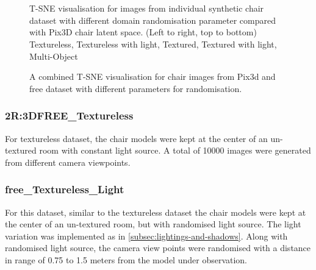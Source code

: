 \begin{figure}[!ht]
    \centering
    \resizebox{0.49\linewidth}{5cm}{}
    \resizebox{0.49\linewidth}{5cm}{}\\
    \resizebox{0.49\linewidth}{5cm}{}
    \resizebox{0.49\linewidth}{5cm}{}\\
    \resizebox{0.49\linewidth}{5cm}{}
    \caption{T-SNE visualisation for images from individual synthetic chair dataset with different domain randomisation parameter compared with Pix3D chair latent space.
        (Left to right, top to bottom) Textureless, Textureless with light, Textured, Textured with light, Multi-Object}
    \label{fig:tsne per chair dataset}
\end{figure}


\begin{figure}
    \centering
    \resizebox{\textwidth}{!}{}
    \caption{A combined T-SNE visualisation for chair images from Pix3d and \gls{free} dataset with different parameters for randomisation.}
    \label{fig:pix3dchair_s2r3dfreechair}
\end{figure}

\subsubsection{2R:3DFREE\_Textureless}

    For textureless dataset, the chair models were kept at the center of an un-textured room with constant light source.
    A total of 10000 images were generated from different camera viewpoints.

\subsubsection{\gls{free}\_Textureless\_Light}

    For this dataset, similar to the textureless dataset the chair models were kept at the center of an un-textured room, but with randomised light source.
    The light variation was implemented as in \autoref{subsec:lightings-and-shadows}.
    Along with randomised light source, the camera view points were randomised with a distance in range of 0.75 to 1.5 meters from the model under observation.

